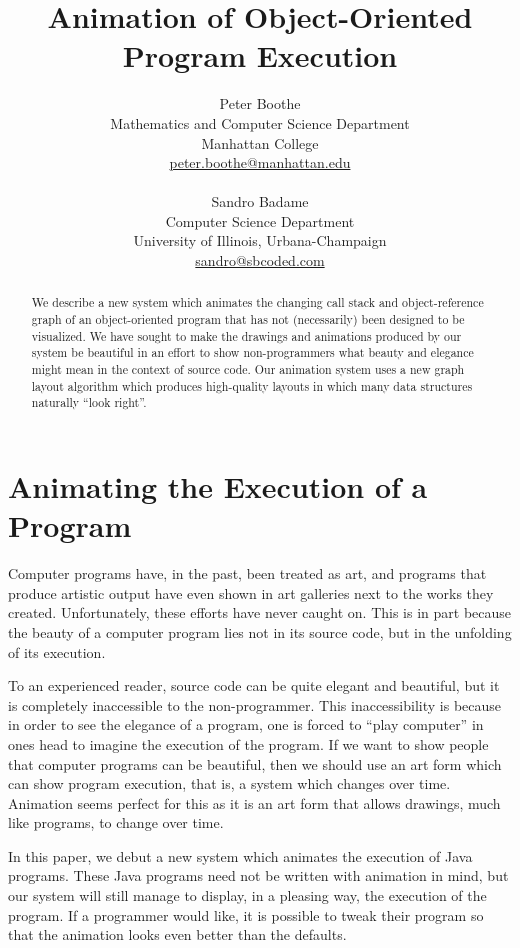\documentclass[11pt]{article}
\title{\textbf{Animation of Object-Oriented Program Execution}}
\author{
 	Peter Boothe\\
	Mathematics and Computer Science Department \\
	Manhattan College \\
	\url{peter.boothe@manhattan.edu}\\
        \\
 	Sandro Badame \\
	Computer Science Department \\
	University of Illinois, Urbana-Champaign \\
	\url{sandro@sbcoded.com}
}
\date{}
\begin{document}
\maketitle

\thispagestyle{empty}

\begin{abstract}

We describe a new system which animates the changing call stack and object-reference graph of an object-oriented program that has not (necessarily) been designed to be visualized.  We have sought to make the drawings and animations produced by our system be beautiful in an effort to show non-programmers what beauty and elegance might mean in the context of source code.  Our animation system uses a new graph layout algorithm which produces high-quality layouts in which many data structures naturally ``look right''.

\end{abstract}

\section{Animating the Execution of a Program}

Computer programs have, in the past, been treated as art, and programs that
produce artistic output have even shown in art galleries next to the works they
created.  Unfortunately, these efforts have never caught on.  This is in part
because the beauty of a computer program lies not in its source code, but in
the unfolding of its execution.  

To an experienced reader, source code can be quite elegant and beautiful, but
it is completely inaccessible to the non-programmer.  This inaccessibility is
because in order to see the elegance of a program, one is forced to ``play
computer'' in ones head to imagine the execution of the program.  If we want to
show people that computer programs can be beautiful, then we should use an art
form which can show program execution, that is, a system which changes over
time. Animation seems perfect for this as it is an art form that allows
drawings, much like programs, to change over time.

In this paper, we debut a new system which animates the execution of Java
programs.  These Java programs need not be written with animation in mind, but our system will still manage to display, in a pleasing way, the execution of the program.  If a programmer would like, it is possible to tweak their program so that the animation looks even better than the defaults.
\end{document}
